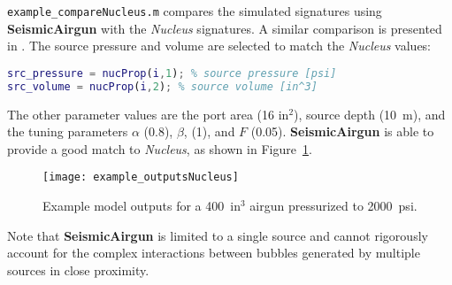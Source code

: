 \documentclass[10pt]{article}
\begin{document}
\texttt{example\_compareNucleus.m} compares the simulated signatures using {\bf SeismicAirgun} with the \emph{Nucleus} signatures. A similar comparison is presented in \citet{Watson2017_airgun}. The source pressure and volume are selected to match the \emph{Nucleus} values:
\begin{lstlisting}[language=Matlab]
src_pressure = nucProp(i,1); % source pressure [psi]
src_volume = nucProp(i,2); % source volume [in^3]
\end{lstlisting}
The other parameter values are the port area (16 in$^2$), source depth (10~m), and the tuning parameters $\alpha$ (0.8), $\beta$, (1), and $F$ (0.05). {\bf SeismicAirgun} is able to provide a good match to \emph{Nucleus}, as shown in Figure~\ref{fig:example outputsNucleus}. 

\begin{figure}[h!]
\centering
\texttt{[image: example\_outputsNucleus]}
\caption{Example model outputs for a 400~in$^3$ airgun pressurized to 2000~psi.}
\label{fig:example outputsNucleus}
\end{figure}

Note that {\bf SeismicAirgun} is limited to a single source and cannot rigorously account for the complex interactions between bubbles generated by multiple sources in close proximity. 
\end{document}

